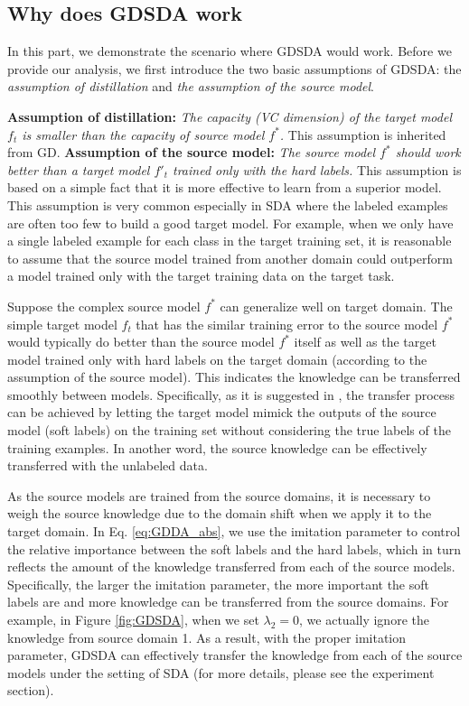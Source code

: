 \subsection{Why does GDSDA work}
In this part, we demonstrate the scenario where GDSDA would work. Before we provide our analysis, we first introduce the two basic assumptions of GDSDA: the \textit{assumption of distillation} and \textit{the assumption of the source model}.

\textbf{Assumption of distillation:} \textit{The capacity (VC dimension) of the target model $f_t$ is smaller than the capacity of source model $f^*$.} This assumption is inherited from GD.
\textbf{Assumption of the source model:} \textit{The source model $f^*$ should work better than a target model $f'_t$ trained only with the hard labels.} 
This assumption is based on a simple fact that it is more effective to learn from a superior model. This assumption is very common especially in SDA where the labeled examples are often too few to build a good target model.
For example, when we only have a single labeled example for each class in the target training set, it is reasonable to assume that the source model trained from another domain could outperform a model trained only with the target training data on the target task. %

Suppose the complex source model $f^*$ can generalize well on target domain. The simple target model $f_t$ that has the similar training error to the source model $f^*$ would typically do better than the source model $f^*$ itself as well as the target model trained only with hard labels on the target domain (according to the assumption of the source model). This indicates the knowledge can be transferred smoothly between models. Specifically, as it is suggested in \cite{hinton2015distilling}, the transfer process can be achieved by letting the target model mimick the outputs of the source model (soft labels) on the training set without considering the true labels of the training examples. In another word, the source knowledge can be effectively transferred with the unlabeled data.

As the source models are trained from the source domains, it is necessary to weigh the source knowledge due to the domain shift\cite{karl2001long} when we apply it to the target domain. In Eq. \eqref{eq:GDDA_abs}, we use the imitation parameter to control the relative importance between the soft labels and the hard labels, which in turn reflects the amount of the knowledge transferred from each of the source models. Specifically, the larger the imitation parameter, the more important the soft labels are and more knowledge can be transferred from the source domains. 
For example, in Figure \ref{fig:GDSDA}, when we set $\lambda_2=0$, we actually ignore the knowledge from source domain 1.
As a result, with the proper imitation parameter, GDSDA can effectively transfer the knowledge from each of the source models under the setting of SDA (for more details, please see the experiment section).

